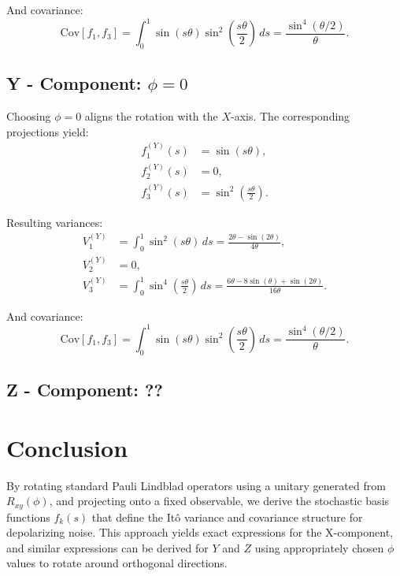 \documentclass[12pt]{article}
\begin{document}
And covariance:
\begin{equation*}
\text{Cov}[f_1, f_3] = \int_0^1 \sin(s\theta)\sin^2\left(\frac{s\theta}{2}\right)\, ds = \frac{\sin^4(\theta/2)}{\theta}.
\end{equation*}

\subsection*{Y - Component: $\phi = 0$}
Choosing $\phi = 0$ aligns the rotation with the $X$-axis. The corresponding projections yield:
\begin{align*}
f_1^{(Y)}(s) &= \sin(s\theta), \\
f_2^{(Y)}(s) &= 0, \\
f_3^{(Y)}(s) &= \sin^2\left(\frac{s\theta}{2}\right).
\end{align*}

Resulting variances:
\begin{align*}
V_1^{(Y)} &= \int_0^1 \sin^2(s\theta)\, ds = \frac{2\theta - \sin(2\theta)}{4\theta}, \\
V_2^{(Y)} &= 0, \\
V_3^{(Y)} &= \int_0^1 \sin^4\left(\frac{s\theta}{2}\right)\, ds = \frac{6\theta - 8\sin(\theta) + \sin(2\theta)}{16\theta}.
\end{align*}

And covariance:
\begin{equation*}
\text{Cov}[f_1, f_3] = \int_0^1 \sin(s\theta)\sin^2\left(\frac{s\theta}{2}\right)\, ds = \frac{\sin^4(\theta/2)}{\theta}.
\end{equation*}


\subsection*{Z - Component: ??}



\section*{Conclusion}
By rotating standard Pauli Lindblad operators using a unitary generated from $R_{xy}(\phi)$, and projecting onto a fixed observable, we derive the stochastic basis functions $f_k(s)$ that define the It\^o variance and covariance structure for depolarizing noise. This approach yields exact expressions for the X-component, and similar expressions can be derived for $Y$ and $Z$ using appropriately chosen $\phi$ values to rotate around orthogonal directions.
\end{document}
